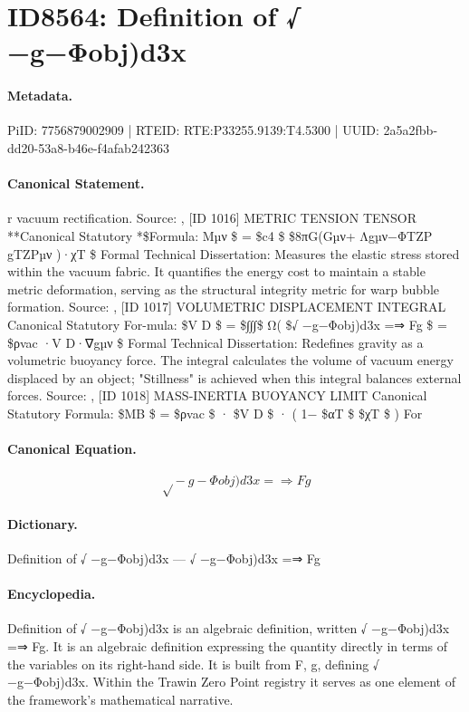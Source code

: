 \section*{ID8564: Definition of √ −g−Φobj)d3x}
\paragraph{Metadata.}
PiID: 7756879002909 | RTEID: RTE:P33255.9139:T4.5300 | UUID: 2a5a2fbb-dd20-53a8-b46e-f4afab242363

\paragraph{Canonical Statement.}
r vacuum rectification. Source: , [ID 1016] METRIC TENSION TENSOR **Canonical Statutory *\$Formula: Mµν \$ = \$c4 \$ \$8πG(Gµν+ Λgµν−ΦTZP gTZPµν )·χT \$ Formal Technical Dissertation: Measures the elastic stress stored within the vacuum fabric. It quantifies the energy cost to maintain a stable metric deformation, serving as the structural integrity metric for warp bubble formation. Source: , [ID 1017] VOLUMETRIC DISPLACEMENT INTEGRAL Canonical Statutory For-mula: \$V D \$ = \$∫∫∫\$ Ω( \$√ −g−Φobj)d3x =⇒ Fg \$ = \$ρvac ·V D·∇gµν \$ Formal Technical Dissertation: Redefines gravity as a volumetric buoyancy force. The integral calculates the volume of vacuum energy displaced by an object; "Stillness" is achieved when this integral balances external forces. Source: , [ID 1018] MASS-INERTIA BUOYANCY LIMIT Canonical Statutory Formula: \$MB \$ = \$ρvac \$ · \$V D \$ · ( 1− \$αT \$ \$χT \$ ) For

\paragraph{Canonical Equation.}
\[
√ −g−Φobj)d3x =⇒ Fg
\]

\paragraph{Dictionary.}
Definition of √ −g−Φobj)d3x — √ −g−Φobj)d3x =⇒ Fg

\paragraph{Encyclopedia.}
Definition of √ −g−Φobj)d3x is an algebraic definition, written √ −g−Φobj)d3x =⇒ Fg. It is an algebraic definition expressing the quantity directly in terms of the variables on its right-hand side. It is built from F, g, defining √ −g−Φobj)d3x. Within the Trawin Zero Point registry it serves as one element of the framework's mathematical narrative.
